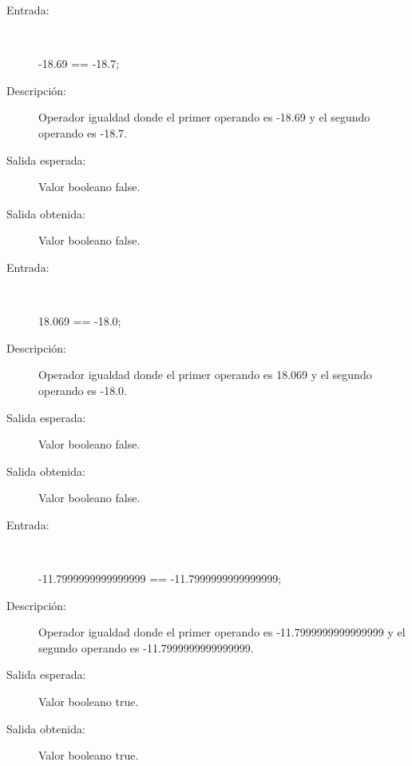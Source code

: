 	\begin{description}
		\item [Entrada:] \hfill \\
\begin{myverbatim}
 -18.69 == -18.7;
\end{myverbatim}
		\item [Descripción:] Operador igualdad donde el primer operando es -18.69 y el segundo operando es  -18.7.
		\item [Salida esperada:] Valor booleano false.
		\item [Salida obtenida:] Valor booleano false.
	\end{description}

	\begin{description}
		\item [Entrada:] \hfill \\
\begin{myverbatim}
 18.069 == -18.0;
\end{myverbatim}
		\item [Descripción:] Operador igualdad donde el primer operando es 18.069 y el segundo operando es  -18.0.
		\item [Salida esperada:] Valor booleano false.
		\item [Salida obtenida:] Valor booleano false.
	\end{description}

	\begin{description}
		\item [Entrada:] \hfill \\
\begin{myverbatim}
 -11.7999999999999999 == -11.7999999999999999;
\end{myverbatim}
		\item [Descripción:] Operador igualdad donde el primer operando es -11.7999999999999999 y el segundo operando es  -11.7999999999999999.
		\item [Salida esperada:] Valor booleano true.
		\item [Salida obtenida:] Valor booleano true.
	\end{description}

